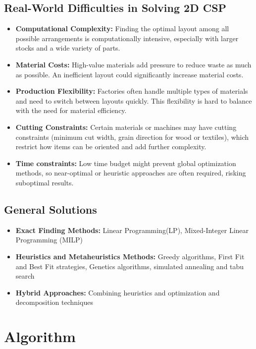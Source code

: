 \documentclass[a4paper]{article}
\begin{document}
\subsection{Real-World Difficulties in Solving 2D CSP}
\begin{itemize}
    \item \textbf{Computational Complexity:} Finding the optimal layout among all possible arrangements is computationally intensive, especially with larger stocks and a wide variety of parts.
    \item \textbf{Material Costs:} High-value materials add pressure to reduce waste as much as possible. An inefficient layout could significantly increase material costs.
    \item \textbf{Production Flexibility:} Factories often handle multiple types of materials and need to switch between layouts quickly. This flexibility is hard to balance with the need for material efficiency.
    \item \textbf{Cutting Constraints:} Certain materials or machines may have cutting constraints (minimum cut width, grain direction for wood or textiles), which restrict how items can be oriented and add further complexity.
    \item \textbf{Time constraints:} Low time budget might prevent global optimization methods, so near-optimal or heuristic approaches are often required, risking suboptimal results.
\end{itemize}

\subsection{General Solutions }
\begin{itemize}
    \item \textbf{Exact Finding Methods:} Linear Programming(LP), Mixed-Integer Linear Programming (MILP)
    \item \textbf{Heuristics and Metaheuristics Methods:} Greedy algorithms, First Fit and Best Fit strategies, Genetics algorithms, simulated annealing and tabu search
    \item \textbf{Hybrid Approaches:} Combining heuristics and optimization and decomposition techniques
\end{itemize}
\section{Algorithm} 
\end{document}
